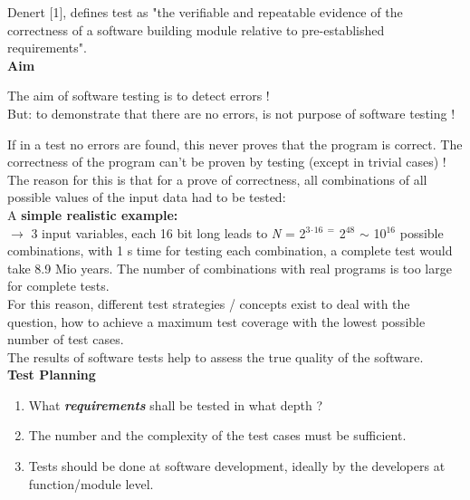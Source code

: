 Denert [1], defines test as "the verifiable and repeatable evidence of the correctness of a software building module relative to pre-established requirements".\\

{\rot\bf Aim}

\begin{tcolorbox}[colback=blue!5!white,colframe=blue!75!black]
The aim of software testing is to detect errors !\\
But: to demonstrate that there are no errors, is not purpose of software testing !
\end{tcolorbox}

If in a test no errors are found, this never proves that the program is correct. The correctness of the program can't be proven by testing (except in trivial cases) !\\

The reason for this is that for a prove of correctness, all combinations of all possible values of the input data had to be tested: \\

A \textbf{simple realistic example:}\\

$\rightarrow$ 3 input variables, each 16 bit long leads to  \textit{N} = 2${}^{3}$${}^{\textrm{·}}$${}^{16\ =\ }$2${}^{48}$ $\mathrm{\sim}$ 10${}^{16}$ possible      combinations,     with 1 s time for testing each combination, a complete test would take 8.9 Mio years. The number of combinations with real programs is too large for complete tests.\\

For this reason, different test strategies / concepts exist to deal with the question, how to achieve a maximum test coverage with the lowest possible number of test cases. \\

The results of software tests help to assess the true quality of the software.\\

{\rot\bf Test Planning}

\begin{enumerate}
\item \textbf{ }What \textbf{\textit{requirements}} shall be tested in what depth ? 
\item  The number and the complexity of the test cases must be sufficient.
\item  Tests should be done at software development, ideally by the developers at  function/module level.
\end{enumerate}

